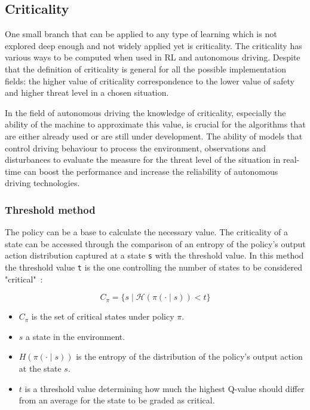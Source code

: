 \subsection{Criticality}\label{sec:subsec_2.1}

One small branch that can be applied to any type of learning which is not explored deep enough and not widely applied yet is criticality. The criticality has various ways to be computed when used in RL and autonomous driving. Despite that the definition of criticality is general for all the possible implementation fields: the higher value of criticality correspondence to the lower value of safety and higher threat level\cite{CriticalityAutonomous2023} in a chosen situation.

In the field of autonomous driving the knowledge of criticality, especially the ability of the machine to approximate this value, is crucial for the algorithms that are either already used or are still under development. The ability of models that control driving behaviour to process the environment, observations and disturbances to evaluate the measure for the threat level of the situation in real-time can boost the performance and increase the reliability of autonomous driving technologies. 

\subsubsection{Threshold method}\label{sec:threshold}

The policy can be a base to calculate the necessary value. The criticality of a state can be accessed through the comparison of an entropy of the policy's output action distribution captured at a state \texttt{s} with the threshold value. In this method the threshold value \texttt{t} is the one controlling the number of states to be considered "critical"~\cite{huang2018establishingappropriatetrustcritical}: 

\begin{equation}
    C_{\pi} = \{ s \mid \mathcal{H}(\pi(\cdot \mid s)) < t \}
    \label{eq:criticality_threshold_1}
\end{equation}

\begin{itemize}
    \item \( C_{\pi} \) is the set of critical states under policy \( \pi \).
    \item \( s \) a state in the environment.
    \item \( H(\pi(\cdot \mid s)) \) is the entropy of the distribution of the policy's output action at the state \( s \).
    \item \( t \) is a threshold value determining how much the highest Q-value should differ from an average for the state to be graded as critical.
\end{itemize}

